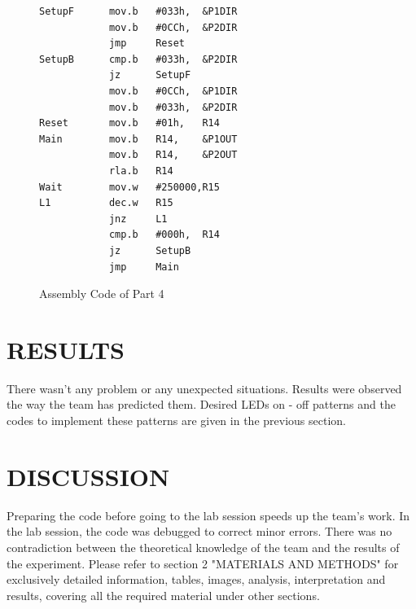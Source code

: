 \documentclass[pdftex,12pt,a4paper]{article}
\begin{document}

\newline{}

\begin{figure}[H]
    \centering
\begin{lstlisting}[language={[x86masm]Assembler}, label={code:part4}, caption={}]
SetupF		mov.b	#033h,	&P1DIR	 
			mov.b	#0CCh,	&P2DIR	 
			jmp 	Reset			 
SetupB		cmp.b	#033h,	&P2DIR	 
			jz		SetupF			 
			mov.b	#0CCh,	&P1DIR	 
			mov.b	#033h,	&P2DIR	 
Reset		mov.b	#01h, 	R14 	 
Main		mov.b 	R14,	&P1OUT	 
			mov.b	R14, 	&P2OUT	 
			rla.b	R14				 
Wait		mov.w 	#250000,R15 	 
L1			dec.w	R15 			 
			jnz 	L1				 
			cmp.b	#000h,	R14		 
			jz 		SetupB			 
			jmp 	Main			 
\end{lstlisting}
    \caption{Assembly Code of Part 4}
    \label{code:part4}
\end{figure}


\section{RESULTS}%
There wasn't any problem or any unexpected situations. Results were observed the way the team has predicted them. Desired LEDs on - off patterns and the codes to implement these patterns are given in the previous section.

\section{DISCUSSION}

\newline{}
Preparing the code before going to the lab session speeds up the team's work. In the lab session, the code was debugged to correct minor errors. There was no contradiction between the theoretical knowledge of the team and the results of the experiment.
\newline
Please refer to section 2 "MATERIALS AND METHODS" for exclusively detailed information, tables, images, analysis, interpretation and results, covering all the required material under other sections.
\end{document}
